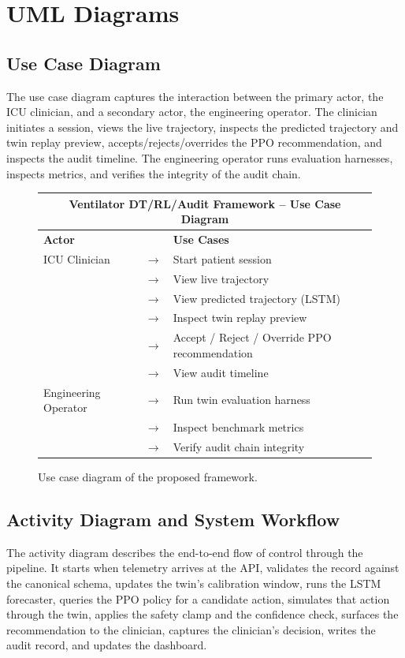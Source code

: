 \documentclass[12pt,a4paper,oneside]{report}
\begin{document}
\section{UML Diagrams}

\subsection{Use Case Diagram}
The use case diagram captures the interaction between the primary actor, the ICU clinician, and a secondary actor, the engineering operator. The clinician initiates a session, views the live trajectory, inspects the predicted trajectory and twin replay preview, accepts/rejects/overrides the PPO recommendation, and inspects the audit timeline. The engineering operator runs evaluation harnesses, inspects metrics, and verifies the integrity of the audit chain.

\begin{figure}[h]
\centering
\begin{tabular}{|p{1.5in}p{0.3in}p{3.4in}|}
\hline
\multicolumn{3}{|c|}{\textbf{Ventilator DT/RL/Audit Framework -- Use Case Diagram}}\\
\hline
\textbf{Actor} & & \textbf{Use Cases}\\
\hline
ICU Clinician & $\rightarrow$ & Start patient session\\
              & $\rightarrow$ & View live trajectory\\
              & $\rightarrow$ & View predicted trajectory (LSTM)\\
              & $\rightarrow$ & Inspect twin replay preview\\
              & $\rightarrow$ & Accept / Reject / Override PPO recommendation\\
              & $\rightarrow$ & View audit timeline\\
\hline
Engineering Operator & $\rightarrow$ & Run twin evaluation harness\\
                     & $\rightarrow$ & Inspect benchmark metrics\\
                     & $\rightarrow$ & Verify audit chain integrity\\
\hline
\end{tabular}
\caption{Use case diagram of the proposed framework.}
\label{fig:usecase}
\end{figure}

\subsection{Activity Diagram and System Workflow}
The activity diagram describes the end-to-end flow of control through the pipeline. It starts when telemetry arrives at the API, validates the record against the canonical schema, updates the twin's calibration window, runs the LSTM forecaster, queries the PPO policy for a candidate action, simulates that action through the twin, applies the safety clamp and the confidence check, surfaces the recommendation to the clinician, captures the clinician's decision, writes the audit record, and updates the dashboard.
\end{document}
